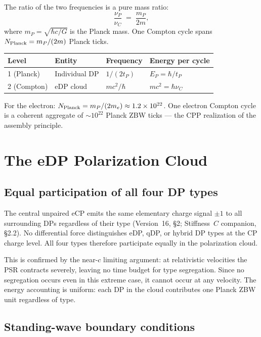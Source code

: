 \documentclass[12pt]{article}
\newcommand{\EP}{E_P}
\newcommand{\tP}{t_P}
\newcommand{\mP}{m_P}
\newcommand{\nuP}{\nu_P}
\newcommand{\nuC}{\nu_C}
\begin{document}
The ratio of the two frequencies is a pure mass ratio:
\begin{equation}
  \frac{\nuP}{\nuC} \;=\; \frac{\mP}{2m},
  \label{eq:ratio}
\end{equation}
where $\mP = \sqrt{\hbar c/G}$ is the Planck mass.  One Compton cycle spans
$N_{\rm Planck} = \mP/(2m)$ Planck ticks.

\begin{center}
\renewcommand{\arraystretch}{1.4}
\begin{tabular}{@{}llll@{}}
\toprule
Level & Entity & Frequency & Energy per cycle \\
\midrule
1 (Planck) & Individual DP & $1/(2\tP)$ & $\EP = \hbar/\tP$ \\
2 (Compton) & eDP cloud & $mc^2/\hbar$ & $mc^2 = \hbar\nuC$ \\
\bottomrule
\end{tabular}
\end{center}

For the electron: $N_{\rm Planck} = \mP/(2m_e) \approx 1.2\times10^{22}$.
One electron Compton cycle is a coherent aggregate of $\sim10^{22}$ Planck
ZBW ticks --- the CPP realization of the assembly principle.

\section{The eDP Polarization Cloud}
\label{sec:cloud}

\subsection{Equal participation of all four DP types}

The central unpaired eCP emits the same elementary charge signal $\pm1$ to
all surrounding DPs regardless of their type (Version~16, \S2; Stiffness~$C$
companion, \S2.2).  No differential force distinguishes eDP, qDP, or hybrid
DP types at the CP charge level.  All four types therefore participate
equally in the polarization cloud.

This is confirmed by the near-$c$ limiting argument: at relativistic
velocities the PSR contracts severely, leaving no time budget for type
segregation.  Since no segregation occurs even in this extreme case, it
cannot occur at any velocity.  The energy accounting is uniform: each DP
in the cloud contributes one Planck ZBW unit regardless of type.

\subsection{Standing-wave boundary conditions}
\end{document}
